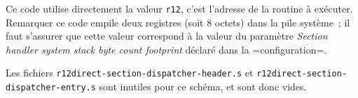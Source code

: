 Ce code utilise directement la valeur \texttt{r12}, c'est l'adresse de la routine à exécuter. Remarquer ce code empile deux registres (soit 8 octets) dans la pile système~; il faut s'assurer que cette valeur correspond à la valeur du paramètre \emph{Section handler system stack byte count footprint} déclaré dans la \plm=configuration=.


Les fichiers \texttt{r12direct-section-dispatcher-header.s} et \texttt{r12direct-section-dispatcher-entry.s} sont inutiles pour ce schéma, et sont donc vides.




